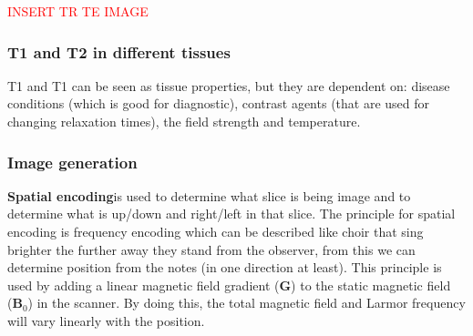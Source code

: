 		\textcolor{red}{INSERT TR TE IMAGE} 
		
		\subsubsection*{T1 and T2 in different tissues}
		T1 and T1 can be seen as tissue properties, but they are dependent on: disease conditions (which is good for diagnostic), contrast agents (that are used for changing relaxation times), the field strength and temperature.

		\subsubsection*{Image generation}
		\textbf{Spatial encoding}is used to determine what slice is being image and to determine what is up/down and right/left in that slice. The principle for spatial encoding is frequency encoding which can be described like choir that sing brighter the further away they stand from the observer, from this we can determine position from the notes (in one direction at least). This principle is used by adding a linear magnetic field gradient (\textbf{G}) to the static magnetic field (\textbf{B}$_0$) in the scanner. By doing this, the total magnetic field and Larmor frequency will vary linearly with the position. 
		

		

		          
		
		

		
			







	